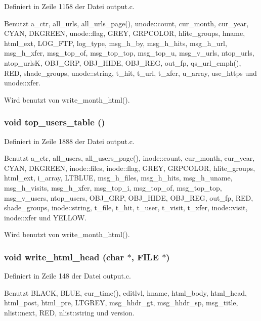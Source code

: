 Definiert in Zeile 1158 der Datei output.c.

Benutzt a\_\-ctr, all\_\-urls, all\_\-urls\_\-page(), unode::count, cur\_\-month, cur\_\-year, CYAN, DKGREEN, unode::flag, GREY, GRPCOLOR, hlite\_\-groups, hname, html\_\-ext, LOG\_\-FTP, log\_\-type, msg\_\-h\_\-by, msg\_\-h\_\-hits, msg\_\-h\_\-url, msg\_\-h\_\-xfer, msg\_\-top\_\-of, msg\_\-top\_\-top, msg\_\-top\_\-u, msg\_\-v\_\-urls, ntop\_\-urls, ntop\_\-urls\-K, OBJ\_\-GRP, OBJ\_\-HIDE, OBJ\_\-REG, out\_\-fp, qs\_\-url\_\-cmph(), RED, shade\_\-groups, unode::string, t\_\-hit, t\_\-url, t\_\-xfer, u\_\-array, use\_\-https und unode::xfer.

Wird benutzt von write\_\-month\_\-html().
\subsubsection{\setlength{\rightskip}{0pt plus 5cm}void top\_\-users\_\-table ()}\label{output_8c_2e8e6386a5b4fa3e5dafd4f2becfb3ce}




Definiert in Zeile 1888 der Datei output.c.

Benutzt a\_\-ctr, all\_\-users, all\_\-users\_\-page(), inode::count, cur\_\-month, cur\_\-year, CYAN, DKGREEN, inode::files, inode::flag, GREY, GRPCOLOR, hlite\_\-groups, html\_\-ext, i\_\-array, LTBLUE, msg\_\-h\_\-files, msg\_\-h\_\-hits, msg\_\-h\_\-uname, msg\_\-h\_\-visits, msg\_\-h\_\-xfer, msg\_\-top\_\-i, msg\_\-top\_\-of, msg\_\-top\_\-top, msg\_\-v\_\-users, ntop\_\-users, OBJ\_\-GRP, OBJ\_\-HIDE, OBJ\_\-REG, out\_\-fp, RED, shade\_\-groups, inode::string, t\_\-file, t\_\-hit, t\_\-user, t\_\-visit, t\_\-xfer, inode::visit, inode::xfer und YELLOW.

Wird benutzt von write\_\-month\_\-html().
\subsubsection{\setlength{\rightskip}{0pt plus 5cm}void write\_\-html\_\-head (char $\ast$, FILE $\ast$)}\label{output_8c_0bc1fdaca7513c4813773bef5529008e}




Definiert in Zeile 148 der Datei output.c.

Benutzt BLACK, BLUE, cur\_\-time(), editlvl, hname, html\_\-body, html\_\-head, html\_\-post, html\_\-pre, LTGREY, msg\_\-hhdr\_\-gt, msg\_\-hhdr\_\-sp, msg\_\-title, nlist::next, RED, nlist::string und version.

